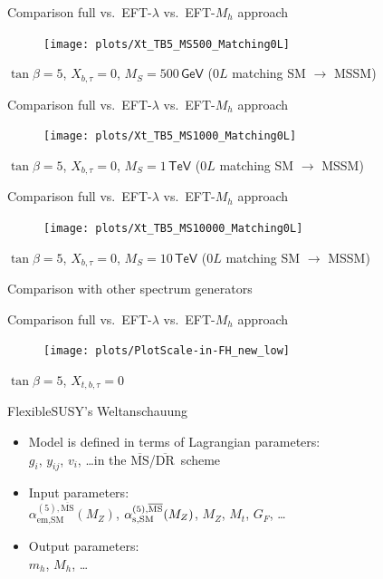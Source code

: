 \documentclass[hyperref={pdfpagelabels=false},ngerman]{beamer}
\newcommand{\eh}[1]{\,\mathsf{#1}}
\newcommand{\DRbar}{\ensuremath{\overline{\text{DR}}}}
\newcommand{\MSbar}{\ensuremath{\overline{\text{MS}}}}
\begin{document}
\begin{frame}[noframenumbering]{Comparison full vs.\ EFT-$\lambda$ vs.\ EFT-$M_h$ approach}
  \begin{figure}
    \centering
    \texttt{[image: plots/Xt\_TB5\_MS500\_Matching0L]}
  \end{figure}
  $\tan\beta = 5$, $X_{b,\tau} = 0$, $M_S = 500\eh{GeV}$ ($0L$ matching SM $\rightarrow$ MSSM)
\end{frame}

\begin{frame}[noframenumbering]{Comparison full vs.\ EFT-$\lambda$ vs.\ EFT-$M_h$ approach}
  \begin{figure}
    \centering
    \texttt{[image: plots/Xt\_TB5\_MS1000\_Matching0L]}
  \end{figure}
  $\tan\beta = 5$, $X_{b,\tau} = 0$, $M_S = 1\eh{TeV}$ ($0L$ matching SM $\rightarrow$ MSSM)
\end{frame}

\begin{frame}[noframenumbering]{Comparison full vs.\ EFT-$\lambda$ vs.\ EFT-$M_h$ approach}
  \begin{figure}
    \centering
    \texttt{[image: plots/Xt\_TB5\_MS10000\_Matching0L]}
  \end{figure}
  $\tan\beta = 5$, $X_{b,\tau} = 0$, $M_S = 10\eh{TeV}$ ($0L$ matching SM $\rightarrow$ MSSM)
\end{frame}

\begin{frame}[noframenumbering]
  \begin{center}
    \Large Comparison with other spectrum generators
  \end{center}
\end{frame}

\begin{frame}[noframenumbering]{Comparison full vs.\ EFT-$\lambda$ vs.\ EFT-$M_h$ approach}
  \begin{figure}
    \centering
    \texttt{[image: plots/PlotScale-in-FH\_new\_low]}
  \end{figure}
  $\tan\beta = 5$, $X_{t,b,\tau} = 0$
\end{frame}

\begin{frame}[noframenumbering]{FlexibleSUSY's Weltanschauung}
  \begin{itemize} \setlength\itemsep{2em}
  \item Model is defined in terms of Lagrangian parameters:\\
    $g_i$, $y_{ij}$, $v_i$, \ldots in the \MSbar/\DRbar\ scheme
  \item Input parameters:\\
    $\alpha_{\text{em},\text{SM}}^{(5),\MSbar}(M_Z)$,
    $\alpha_{\text{s},\text{SM}}^{(5),\text{\MSbar}}(M_Z)$, $M_Z$,
    $M_t$, $G_F$, \ldots
  \item Output parameters:\\ $m_h$, $M_h$, \ldots
  \end{itemize}
\end{frame}
\end{document}
